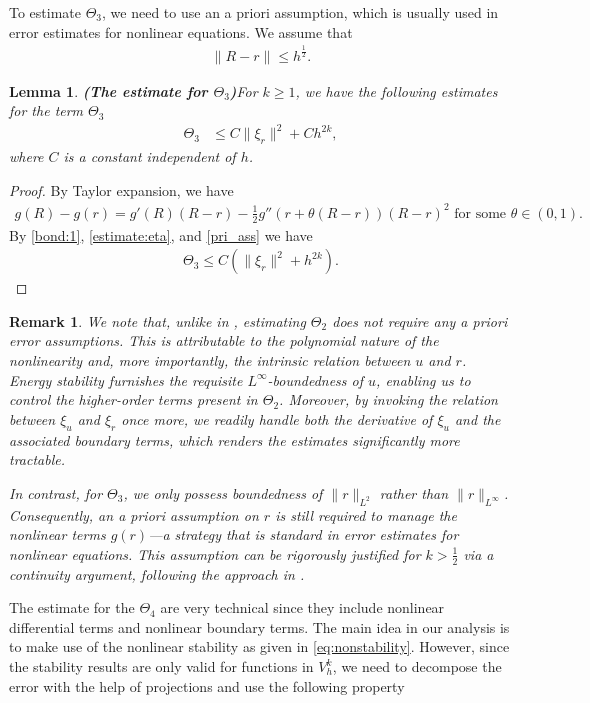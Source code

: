 \documentclass[11pt]{article}
\newtheorem{lemma}{Lemma}[section]
\newtheorem{remark}{Remark}[section]
\numberwithin{equation}{section}
\begin{document}
To estimate $\Theta_3$, we need to use an a priori assumption, which is usually used in error estimates for nonlinear equations. We assume that 
\begin{align}\label{pri_ass}
    \|R-r\|\leq h^{\frac 12}.
\end{align}
\begin{lemma} {\bf{(The estimate for $\Theta_3$)}}\label{lemma:estimate3}
For $k\geq1$, we have the following estimates for the term $\Theta_3$
{
\begin{align}
\Theta_3&\leq C\|\xi_r\|^2+Ch^{2k},\label{eq:est:theta3}
\end{align}
}
where $C$ is a constant independent of $h$.
\end{lemma}
\begin{proof}
By Taylor expansion, we have
\begin{align*}
    g(R)-g(r)=g'(R)(R-r)-\frac{1}{2}g''(r+\theta(R-r))(R-r)^2 \text{ for some } \theta \in (0,1).
\end{align*}
By \eqref{bond:1}, \eqref{estimate:eta}, and \eqref{pri_ass} we have
\begin{align*}
    \Theta_3\leq C(\|\xi_r\|^2+h^{2k}).
\end{align*}
\end{proof}
\begin{remark}
We note that, unlike in \cite{Xu2008CH}, estimating $\Theta_2$ does not require any a priori error assumptions. This is attributable to the polynomial nature of the nonlinearity and, more importantly, the intrinsic relation between $u$ and $r$. Energy stability furnishes the requisite $L^\infty$-boundedness of $u$, enabling us to control the higher-order terms present in $\Theta_2$. Moreover, by invoking the relation between $\xi_u$ and $\xi_r$ once more, we readily handle both the derivative of $\xi_u$ and the associated boundary terms, which renders the estimates significantly more tractable.

In contrast, for $\Theta_3$, we only possess boundedness of $\|r\|_{L^2}$ rather than $\|r\|_{L^\infty}$. Consequently, an a priori assumption on $r$ is still required to manage the nonlinear terms $g(r)$---a strategy that is standard in error estimates for nonlinear equations. This assumption can be rigorously justified for $k >\frac{1}{2}$ via a continuity argument, following the approach in \cite{Xu2008CH}.
\end{remark}
The estimate for the $\Theta_4$ are very technical since they include nonlinear differential terms and nonlinear boundary terms. The main idea in our analysis is to make use of the nonlinear stability as given in \eqref{eq:nonstability}. However, since the stability results are only valid for functions in $V_h^k$, we need to decompose the error with the help of projections and use the following property
\end{document}
